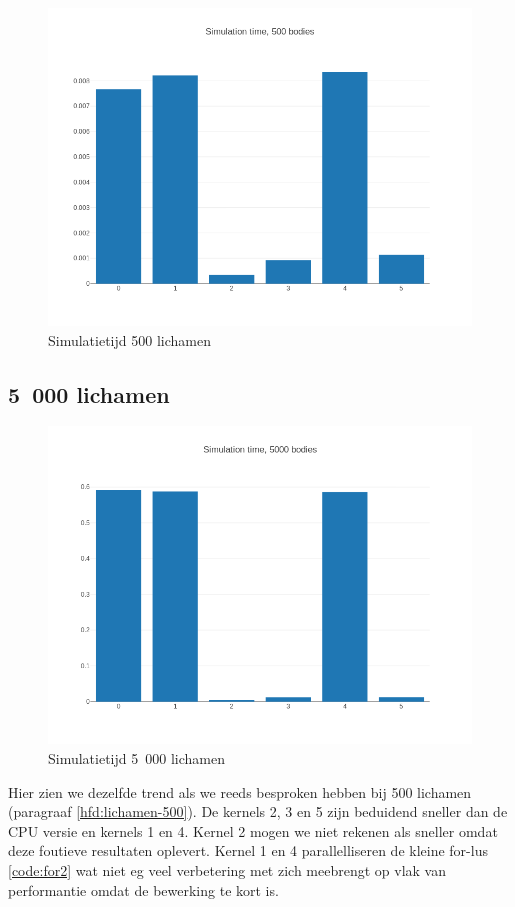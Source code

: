 \documentclass{article}
\begin{document}
\begin{figure}[H]
    \includegraphics[width=\linewidth]{./grafiekskes/hist_simulation500.png}
    \caption{Simulatietijd 500 lichamen}
\end{figure}

\subsection{5~000 lichamen}
\begin{figure}[H]
    \includegraphics[width=\linewidth]{./grafiekskes/hist_simulation5000.png}
    \caption{Simulatietijd 5~000 lichamen}
\end{figure}

Hier zien we dezelfde trend als we reeds besproken hebben bij 500 lichamen (paragraaf \ref{hfd:lichamen-500}).
De kernels 2, 3 en 5 zijn beduidend sneller dan de CPU versie en kernels 1 en 4. Kernel 2 mogen we niet rekenen als
sneller omdat deze foutieve resultaten oplevert. Kernel 1 en 4 parallelliseren de kleine for-lus \ref{code:for2}
wat niet eg veel verbetering met zich meebrengt op vlak van performantie omdat de bewerking te kort is.
\end{document}
